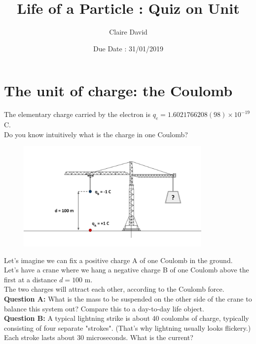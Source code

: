 \documentclass[12pt]{article}
\title{Life of a Particle : Quiz on Unit}
\author{Claire David}
\date{Due Date : 31/01/2019}
\begin{document}
\maketitle


\section{The unit of charge: the Coulomb}
The elementary charge carried by the electron is $q_e = 1.6021766208(98) \times 10^{-19}$ C.\\
Do you know intuitively what is the charge in one Coulomb?

\begin{figure}[h]
    \centering
    \includegraphics[width=0.85\textwidth]{Coulomb_quiz.png}
\end{figure}
Let's imagine we can fix a positive charge A of one Coulomb in the ground.\\
Let's have a crane where we hang a negative charge B of one Coulomb above the first at a distance $d = 100$ m.\\
The two charges will attract each other, according to the Coulomb force.\\


\textbf{Question A:} What is the mass to be suspended on the other side of the crane to balance this system out? Compare this to a day-to-day life object.\\



\textbf{Question B:} A typical lightning strike is about 40 coulombs of charge, typically consisting of four separate "strokes". (That's why lightning usually looks flickery.) Each stroke lasts about 30 microseconds. What is the current?\\
\end{document}
